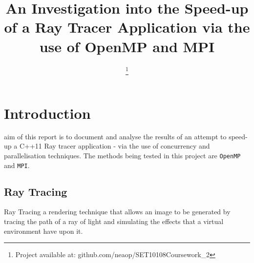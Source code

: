 \documentclass[journal,transmag]{IEEEtran}
\begin{document}
\title{An Investigation into the Speed-up of a Ray Tracer Application via the use of OpenMP and MPI}

\author{

\thanks{Project available at: github.com/neaop/SET10108Coursework\_2}}




\maketitle

\IEEEdisplaynontitleabstractindextext

\IEEEpeerreviewmaketitle

\section{Introduction}
 
	 aim of this report is to document and analyse the results of an attempt to speed-up a C++11 Ray tracer application - via the use of concurrency and parallelisation techniques. The methods being tested in this project are \texttt{OpenMP} and \texttt{MPI}.
	
	\subsection{Ray Tracing}
		Ray Tracing a rendering technique that allows an image to be generated by tracing the path of a ray of light and simulating the effects that a virtual environment have upon it.
			
\end{document}
